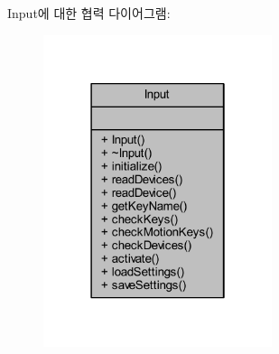 Input에 대한 협력 다이어그램\+:\nopagebreak
\begin{figure}[H]
\begin{center}
\leavevmode
\includegraphics[width=190pt]{class_input__coll__graph}
\end{center}
\end{figure}
